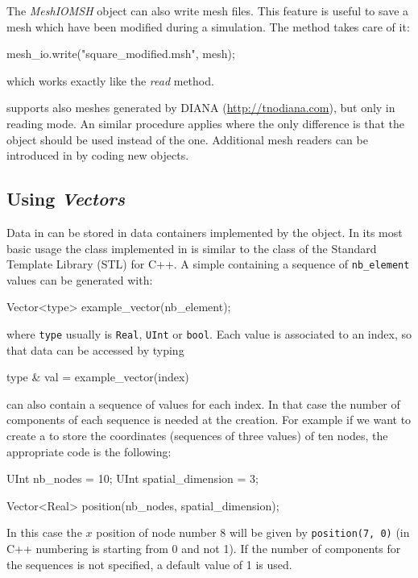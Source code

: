 The \textit{MeshIOMSH} object can also write mesh files. This
feature is useful to save a mesh which have been modified during a
simulation. The  method takes care of it:
\begin{cpp}
  mesh_io.write("square_modified.msh", mesh);
\end{cpp}
which works exactly like the \textit{read} method.

\akantu supports also meshes generated by
DIANA (\url{http://tnodiana.com}), but only in reading mode. An similar
procedure applies where the only
difference is that the  object should be used
instead of the  one. Additional mesh readers can be
introduced in \akantu by coding new  objects.

\subsection{Using \textit{Vectors}}

Data in \akantu can be stored in data containers implemented by
the  object. In its most basic usage the  class
implemented in \akantu is similar to the  class of
the Standard Template Library (STL) for C++. A simple 
containing a sequence of \texttt{nb\_element} values can be generated with:
\begin{cpp}
  Vector<type> example_vector(nb_element);
\end{cpp}
where \texttt{type} usually is \texttt{Real}, \texttt{UInt} or
\texttt{bool}. Each value is associated to an index, so that data can be
accessed by typing

\begin{cpp}
  type & val = example\_vector(index)
\end{cpp}

 can also contain a
sequence of values for each index. In that case the number of components 
of each sequence is needed at the  creation. 
For example if we want to create a  to store
the coordinates (sequences of three values) of ten nodes, the appropriate 
code is the following:
\begin{cpp}
  UInt nb_nodes = 10;
  UInt spatial_dimension = 3;

  Vector<Real> position(nb_nodes, spatial_dimension);
\end{cpp}
In this case the $x$ position of node number 8 will be given by
\texttt{position(7, 0)} (in C++ numbering is starting from 0 and not
1). If the number of components for the sequences is not specified, a
default value of 1 is used.

